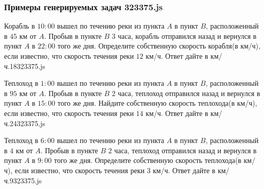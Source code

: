
\subsubsection*{Примеры генерируемых задач 323375.js}   

\par{Корабль в $10:00$ вышел по течению реки из пункта $A$ в пункт $B$, расположенный в $45$ км от $A$. Пробыв в пункте $B$ $3$ часа, корабль отправился назад и вернулся в пункт $A$ в $22:00$ того же дня. Определите собственную скорость корабля(в км/ч), если известно, что скорость течения реки $12$ км/ч. Ответ дайте в км/ч.}{18}{323375.js}
\par{Теплоход в $1:00$ вышел по течению реки из пункта $A$ в пункт $B$, расположенный в $95$ км от $A$. Пробыв в пункте $B$ $2$ часа, теплоход отправился назад и вернулся в пункт $A$ в $15:00$ того же дня. Найдите собственную скорость теплохода(в км/ч), если известно, что скорость течения реки $14$ км/ч. Ответ дайте в км/ч.}{24}{323375.js}
\par{ Теплоход в $6:00$ вышел по течению реки из пункта $A$ в пункт $B$, расположенный в $4$ км от $A$. Пробыв в пункте $B$ $2$ часа, теплоход отправился назад и вернулся в пункт $A$ в $9:00$ того же дня. Определите собственную скорость теплохода(в км/ч), если известно, что скорость течения реки $3$ км/ч. Ответ дайте в км/ч.}{9}{323375.js}	

